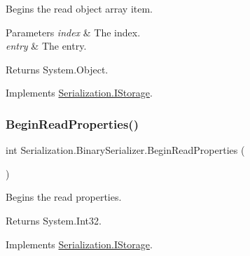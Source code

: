 Begins the read object array item. 


\begin{DoxyParams}{Parameters}
{\em index} & The index.\\
\hline
{\em entry} & The entry.\\
\hline
\end{DoxyParams}
\begin{DoxyReturn}{Returns}
System.\+Object.
\end{DoxyReturn}


Implements \hyperlink{interface_serialization_1_1_i_storage_a3d3197fc76431c156d291c5e46240018}{Serialization.\+I\+Storage}.

\mbox{\label{class_serialization_1_1_binary_serializer_ae6b1ddb821a9809f1428640e3bd75e7b}} 
\subsubsection{\texorpdfstring{Begin\+Read\+Properties()}{BeginReadProperties()}}
{\footnotesize\ttfamily int Serialization.\+Binary\+Serializer.\+Begin\+Read\+Properties (\begin{DoxyParamCaption}{ }\end{DoxyParamCaption})\hspace{0.3cm}{\ttfamily [inline]}}



Begins the read properties. 

\begin{DoxyReturn}{Returns}
System.\+Int32.
\end{DoxyReturn}


Implements \hyperlink{interface_serialization_1_1_i_storage_a14c84cc7b9483b89881c5caef8e4f1a0}{Serialization.\+I\+Storage}.

\mbox{\label{class_serialization_1_1_binary_serializer_a0c77f70b9259bc13d96eafe34b092f3b}} 
